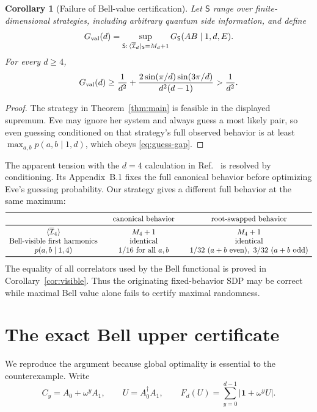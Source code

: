\documentclass[11pt]{article}
\newtheorem{corollary}[theorem]{Corollary}
\theoremstyle{remark}
\newcommand{\Id}{\mathbf 1}
\newcommand{\cI}{\mathcal I}
\newcommand{\absop}[1]{\lvert #1\rvert}
\begin{document}
\begin{corollary}[Failure of Bell-value certification]\label{cor:value}
Let \(\mathsf S\) range over finite-dimensional strategies, including
arbitrary quantum side information, and define
\[
  G_{\rm val}(d)
  =
  \sup_{\mathsf S:\,
  \langle\overline{\cI}_d\rangle_{\mathsf S}=M_d+1}
  G_{\mathsf S}(AB\mid1,d,E).
\]
For every \(d\geq4\),
\begin{equation}
  G_{\rm val}(d)
  \geq
  \frac1{d^2}
  +
  \frac{2\sin(\pi/d)\sin(3\pi/d)}{d^2(d-1)}
  >\frac1{d^2}.
  \label{eq:value-corollary}
\end{equation}
\end{corollary}

\begin{proof}
The strategy in Theorem~\ref{thm:main} is feasible in the displayed
supremum.  Eve may ignore her system and always guess a most likely pair, so
even guessing conditioned on that strategy's full observed behavior is at
least \(\max_{a,b}p(a,b\mid1,d)\), which obeys
\eqref{eq:guess-gap}.
\end{proof}

The apparent tension with the \(d=4\) calculation in
Ref.~\cite{PeritoEtAl2026} is resolved by conditioning.  Its Appendix~B.1
fixes the full canonical behavior before optimizing Eve's guessing
probability.  Our strategy gives a different full behavior at the same
maximum:
\[
\begin{array}{c@{\qquad}c@{\qquad}c}
\toprule
 &\text{canonical behavior}&\text{root-swapped behavior}\\
\midrule
\langle\overline{\cI}_4\rangle&M_4+1&M_4+1\\
\text{Bell-visible first harmonics}&\text{identical}&\text{identical}\\
p(a,b\mid1,4)&1/16\ \text{for all }a,b&
  1/32\ (a+b\ {\rm even}),\ 3/32\ (a+b\ {\rm odd})\\
\bottomrule
\end{array}
\]
The equality of all correlators used by the Bell functional is proved in
Corollary~\ref{cor:visible}.  Thus the originating fixed-behavior SDP may be
correct while maximal Bell value alone fails to certify maximal randomness.

\section{The exact Bell upper certificate}\label{sec:upper}

We reproduce the argument because global optimality is essential to the
counterexample.  Write
\[
  C_y=A_0+\omega^yA_1,\qquad U=A_0^\dagger A_1,\qquad
  F_d(U)=\sum_{y=0}^{d-1}\absop{\Id+\omega^yU}.
\]
\end{document}
